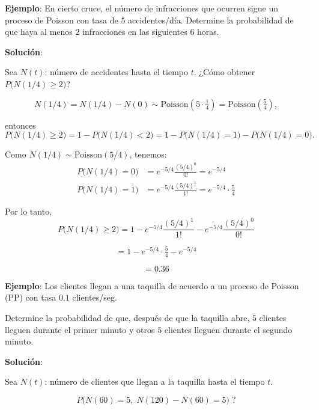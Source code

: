 \documentclass[12pt,a4paper]{article}
\begin{document}
\textbf{Ejemplo}: En cierto cruce, el número de infracciones que ocurren sigue un proceso de Poisson con tasa de $5$ accidentes/día.  
Determine la probabilidad de que haya al menos $2$ infracciones en las siguientes $6$ horas.

\textbf{Solución}:

Sea $N(t)$: número de accidentes hasta el tiempo $t$. ¿Cómo obtener $P\big(N(1/4) \geq 2\big)$?


\begin{equation*}
N(1/4) = N(1/4) - N(0) \sim \text{Poisson}\!\left( 5 \cdot \tfrac{1}{4} \right) 
= \text{Poisson}\!\left(\tfrac{5}{4}\right),
\end{equation*}

entonces
\begin{equation*}
P\big(N(1/4) \geq 2\big) 
= 1 - P\big(N(1/4) < 2\big)
= 1 - P\big(N(1/4) = 1\big) - P\big(N(1/4) = 0\big).
\end{equation*}

Como $N(1/4) \sim \text{Poisson}(5/4)$, tenemos:
\begin{align*}
P\big(N(1/4) = 0\big) &= e^{-5/4} \frac{(5/4)^0}{0!} = e^{-5/4} \\
P\big(N(1/4) = 1\big) &= e^{-5/4} \frac{(5/4)^1}{1!} = e^{-5/4} \cdot \tfrac{5}{4}
\end{align*}

Por lo tanto,
\begin{equation*}
P\big(N(1/4) \geq 2\big) 
= 1 - e^{-5/4}\frac{(5/4)^1}{1!} - e^{-5/4}\frac{(5/4)^0}{0!}
\end{equation*}

\begin{equation*}
= 1 - e^{-5/4}\cdot \tfrac{5}{4} - e^{-5/4}
\end{equation*}

\begin{equation*}
= 0.36
\end{equation*}

\textbf{Ejemplo}: Los clientes llegan a una taquilla de acuerdo a un proceso de Poisson (PP) con tasa $0.1$ clientes/seg.  

Determine la probabilidad de que, después de que la taquilla abre, $5$ clientes lleguen durante el primer minuto y otros $5$ clientes lleguen durante el segundo minuto.

\textbf{Solución}:

Sea $N(t)$: número de clientes que llegan a la taquilla hasta el tiempo $t$.

\begin{equation*}
P\big(N(60) = 5,\; N(120) - N(60) = 5\big)\; ?
\end{equation*}
\end{document}
